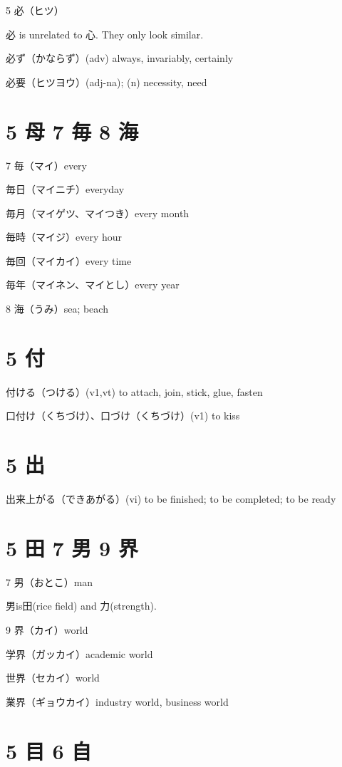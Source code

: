 5 必（ヒツ）

必 is unrelated to 心. They only look similar.

必ず（かならず）(adv) always, invariably, certainly

必要（ヒツヨウ）(adj-na); (n) necessity, need

\section{5 母 7 毎 8 海}

7 毎（マイ）every

毎日（マイニチ）everyday

毎月（マイゲツ、マイつき）every month

毎時（マイジ）every hour

毎回（マイカイ）every time

毎年（マイネン、マイとし）every year

8 海（うみ）sea; beach

\section{5 付}

付ける（つける）(v1,vt) to attach, join, stick, glue, fasten

口付け（くちづけ）、口づけ（くちづけ）(v1) to kiss

\section{5 出}

出来上がる（できあがる）(vi) to be finished; to be completed; to be ready

\section{5 田 7 男 9 界}

7 男（おとこ）man

男is田(rice field) and 力(strength).

9 界（カイ）world

学界（ガッカイ）academic world

世界（セカイ）world

業界（ギョウカイ）industry world, business world

\section{5 目 6 自}

